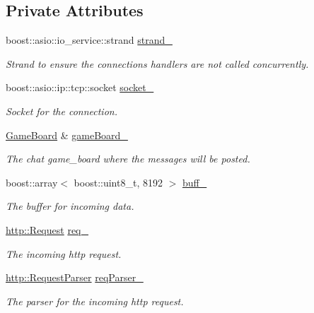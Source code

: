 \subsection*{Private Attributes}
\begin{DoxyCompactItemize}
\item 
boost\+::asio\+::io\+\_\+service\+::strand \hyperlink{classwebsocket_1_1Session_a394bb9b578c166e22b2a630b8ea013fb}{strand\+\_\+}
\begin{DoxyCompactList}\small\item\em Strand to ensure the connection\textquotesingle{}s handlers are not called concurrently. \end{DoxyCompactList}\item 
boost\+::asio\+::ip\+::tcp\+::socket \hyperlink{classwebsocket_1_1Session_a7e7771fef3f105f4019ef9a1c2f04eb5}{socket\+\_\+}
\begin{DoxyCompactList}\small\item\em Socket for the connection. \end{DoxyCompactList}\item 
\hyperlink{classwebsocket_1_1GameBoard}{Game\+Board} \& \hyperlink{classwebsocket_1_1Session_add75c0a25f69839df5441997846b3f3e}{game\+Board\+\_\+}
\begin{DoxyCompactList}\small\item\em The chat game\+\_\+board where the messages will be posted. \end{DoxyCompactList}\item 
boost\+::array$<$ boost\+::uint8\+\_\+t, 8192 $>$ \hyperlink{classwebsocket_1_1Session_a4a7ca92db9c843899fbf3673fe5b9f52}{buff\+\_\+}
\begin{DoxyCompactList}\small\item\em The buffer for incoming data. \end{DoxyCompactList}\item 
\hyperlink{structwebsocket_1_1http_1_1Request}{http\+::\+Request} \hyperlink{classwebsocket_1_1Session_a80b1e6b3657a3c3528acd3c9b4e453a5}{req\+\_\+}
\begin{DoxyCompactList}\small\item\em The incoming http request. \end{DoxyCompactList}\item 
\hyperlink{classwebsocket_1_1http_1_1RequestParser}{http\+::\+Request\+Parser} \hyperlink{classwebsocket_1_1Session_a0336ca414e7c038331b39a01cdb23da8}{req\+Parser\+\_\+}
\begin{DoxyCompactList}\small\item\em The parser for the incoming http request. \end{DoxyCompactList}\item 

\end{DoxyCompactItemize}
